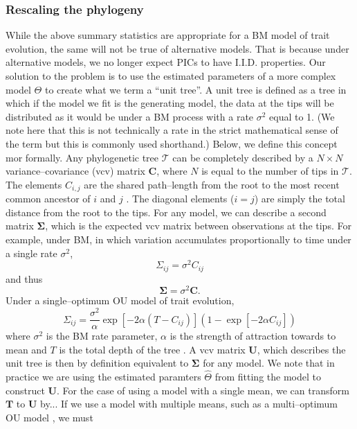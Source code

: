 \documentclass[12pt]{article}
\begin{document}
\subsubsection{Rescaling the phylogeny}

While the above summary statistics are appropriate for a BM model of trait evolution, the same will not be true of alternative models. That is because under alternative models, we no longer expect PICs to have I.I.D. properties. Our solution to the problem is to use the estimated parameters of a more complex model $\Theta$ to create what we term a ``unit tree''. A unit tree is defined as a tree in which if the model we fit is the generating model, the data at the tips will be distributed as it would be under a BM process with a rate $\sigma^2$ equal to 1. (We note here that this is not technically a rate in the strict mathematical sense of the term \citep{Bookstein1987} but this is commonly used shorthand.)  Below, we define this concept mor formally. Any phylogenetic tree $\mathcal{T}$ can be completely described by a $N \times N$ variance--covariance (vcv) matrix $\mathbf{C}$, where $N$ is equal to the number of tips in $\mathcal{T}$. The elements $C_{i,j}$ are the shared path--length from the root to the most recent common ancestor of $i$ and $j$ \citep{Piazza1975}. The diagonal elements ($i = j$) are simply the total distance from the root to the tips. For any model, we can describe a second matrix $\mathbf{\Sigma}$, which is the expected vcv matrix between observations at the tips. For example, under BM, in which variation accumulates proportionally to time under a single rate $\sigma^2$, 
\begin{equation}
\Sigma_{ij} = \sigma^2 C_{ij}
\end{equation}
and thus
\begin{equation}
\mathbf{\Sigma} = \sigma^2 \mathbf{C}.
\end{equation}
Under a single--optimum OU model of trait evolution, 
\begin{equation}
\Sigma_{ij} = \frac{\sigma^2}{\alpha} \exp[-2\alpha (T-C_{ij})] (1- \exp[-2\alpha C_{ij}])
\end{equation}
where $\sigma^2$ is the BM rate parameter, $\alpha$ is the strength of attraction towards to mean and $T$ is the total depth of the tree \citep{Hansen1997, ButlerKing2004}. A vcv matrix $\mathbf{U}$, which describes the unit tree is then by definition equivalent to $\mathbf{\Sigma}$ for any model. We note that in practice we are using the estimated paramters $\hat{\Theta}$ from fitting the model to construct $\mathbf{U}$. For the case of using a model with a single mean, we can transform $\mathbf{T}$ to $\mathbf{U}$ by... If we use a model with multiple means, such as a multi--optimum OU model \citep{ButlerKing2004, Beaulieu2012}, we must 
\end{document}
